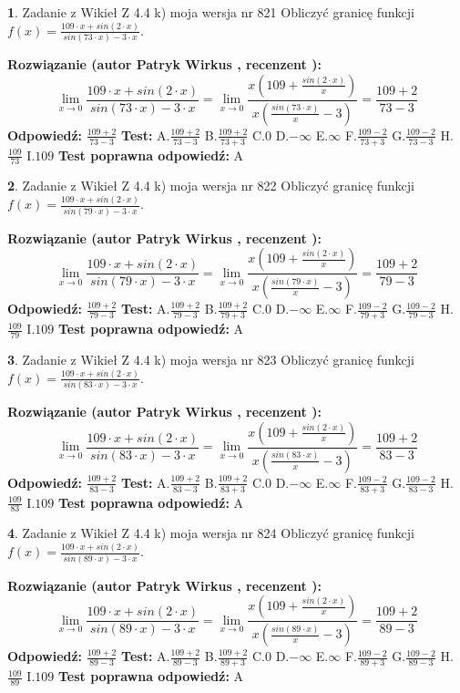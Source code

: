 \documentclass[12pt, a4paper]{article}
\theoremstyle{definition} %
\newtheorem{zad}{}
\newcommand{\zadStart}[1]{\begin{zad}#1\newline}
\newcommand{\zadStop}{\end{zad}}
\newcommand{\rozwStart}[2]{\noindent \textbf{Rozwiązanie (autor #1 , recenzent #2): }\newline}
\newcommand{\rozwStop}{\newline}
\newcommand{\odpStart}{\noindent \textbf{Odpowiedź:}\newline}
\newcommand{\odpStop}{\newline}
\newcommand{\testStart}{\noindent \textbf{Test:}\newline}
\newcommand{\testStop}{\newline}
\newcommand{\kluczStart}{\noindent \textbf{Test poprawna odpowiedź:}\newline}
\newcommand{\kluczStop}{\newline}
\begin{document}
\zadStart{Zadanie z Wikieł Z 4.4 k) moja wersja nr 821}
Obliczyć granicę funkcji $f(x)=\frac{109\cdot x +sin(2\cdot x)}{sin(73\cdot x) -3\cdot x}$.
\zadStop
\rozwStart{Patryk Wirkus}{}
$$\lim\limits_{x\to 0}\frac{109\cdot x +sin(2\cdot x)}{sin(73\cdot x) -3\cdot x}
=\lim\limits_{x\to 0}\frac{x(109+\frac{sin(2\cdot x)}{x})}{x(\frac{sin(73\cdot x)}{x}-3)}
=\frac{109+2}{73-3}$$
\rozwStop
\odpStart
$\frac{109+2}{73-3}$
\odpStop
\testStart
A.$\frac{109+2}{73-3}$
B.$\frac{109+2}{73+3}$
C.$0$
D.$-\infty$
E.$\infty$
F.$\frac{109-2}{73+3}$
G.$\frac{109-2}{73-3}$
H.$\frac{109}{73}$
I.$109$
\testStop
\kluczStart
A
\kluczStop



\zadStart{Zadanie z Wikieł Z 4.4 k) moja wersja nr 822}
Obliczyć granicę funkcji $f(x)=\frac{109\cdot x +sin(2\cdot x)}{sin(79\cdot x) -3\cdot x}$.
\zadStop
\rozwStart{Patryk Wirkus}{}
$$\lim\limits_{x\to 0}\frac{109\cdot x +sin(2\cdot x)}{sin(79\cdot x) -3\cdot x}
=\lim\limits_{x\to 0}\frac{x(109+\frac{sin(2\cdot x)}{x})}{x(\frac{sin(79\cdot x)}{x}-3)}
=\frac{109+2}{79-3}$$
\rozwStop
\odpStart
$\frac{109+2}{79-3}$
\odpStop
\testStart
A.$\frac{109+2}{79-3}$
B.$\frac{109+2}{79+3}$
C.$0$
D.$-\infty$
E.$\infty$
F.$\frac{109-2}{79+3}$
G.$\frac{109-2}{79-3}$
H.$\frac{109}{79}$
I.$109$
\testStop
\kluczStart
A
\kluczStop



\zadStart{Zadanie z Wikieł Z 4.4 k) moja wersja nr 823}
Obliczyć granicę funkcji $f(x)=\frac{109\cdot x +sin(2\cdot x)}{sin(83\cdot x) -3\cdot x}$.
\zadStop
\rozwStart{Patryk Wirkus}{}
$$\lim\limits_{x\to 0}\frac{109\cdot x +sin(2\cdot x)}{sin(83\cdot x) -3\cdot x}
=\lim\limits_{x\to 0}\frac{x(109+\frac{sin(2\cdot x)}{x})}{x(\frac{sin(83\cdot x)}{x}-3)}
=\frac{109+2}{83-3}$$
\rozwStop
\odpStart
$\frac{109+2}{83-3}$
\odpStop
\testStart
A.$\frac{109+2}{83-3}$
B.$\frac{109+2}{83+3}$
C.$0$
D.$-\infty$
E.$\infty$
F.$\frac{109-2}{83+3}$
G.$\frac{109-2}{83-3}$
H.$\frac{109}{83}$
I.$109$
\testStop
\kluczStart
A
\kluczStop



\zadStart{Zadanie z Wikieł Z 4.4 k) moja wersja nr 824}
Obliczyć granicę funkcji $f(x)=\frac{109\cdot x +sin(2\cdot x)}{sin(89\cdot x) -3\cdot x}$.
\zadStop
\rozwStart{Patryk Wirkus}{}
$$\lim\limits_{x\to 0}\frac{109\cdot x +sin(2\cdot x)}{sin(89\cdot x) -3\cdot x}
=\lim\limits_{x\to 0}\frac{x(109+\frac{sin(2\cdot x)}{x})}{x(\frac{sin(89\cdot x)}{x}-3)}
=\frac{109+2}{89-3}$$
\rozwStop
\odpStart
$\frac{109+2}{89-3}$
\odpStop
\testStart
A.$\frac{109+2}{89-3}$
B.$\frac{109+2}{89+3}$
C.$0$
D.$-\infty$
E.$\infty$
F.$\frac{109-2}{89+3}$
G.$\frac{109-2}{89-3}$
H.$\frac{109}{89}$
I.$109$
\testStop
\kluczStart
A
\kluczStop
\end{document}
